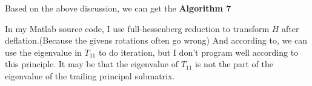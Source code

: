 Based on the above discussion, we can get the \textbf{Algorithm 7}


In my Matlab source code, I use full-hessenberg reduction to transform \(H\) after deflation.(Because the givens rotations often go wrong) And according to\cite{AED}, we can use the eigenvalue in \(T_{11}\) to do iteration, but I don't program well according to this principle. It may be that the eigenvalue of \(T_{11}\) is not the part of the eigenvalue of the trailing principal submatrix.